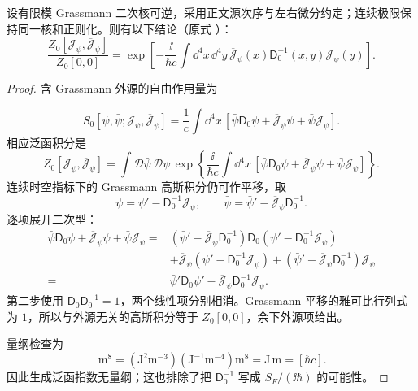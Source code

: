 \begin{proposition}
设有限模 Grassmann 二次核可逆，采用正文源次序与左右微分约定；连续极限保持同一核和正则化。则有以下结论（原式 ）：
\begin{equation*}
 \boxed{
 \frac{Z_0[\mathcal J_\psi,\overline{\mathcal J}_\psi]}{Z_0[0,0]}
 =\exp\!\left[
 -\frac{\ii}{\hbar c}
 \int\dd^4 x\,\dd^4 y\,
 \overline{\mathcal J}_\psi(x)\mathsf D_0^{-1}(x,y)\mathcal J_\psi(y)
 \right].}
\end{equation*}
\end{proposition}
\begin{proof}
含 Grassmann 外源的自由作用量为

\begin{equation*}
 S_0[\psi,\bar\psi;\mathcal J_\psi,\overline{\mathcal J}_\psi]
 =\frac1c\int\dd^4 x\,
 \left[
 \bar\psi\mathsf D_0\psi+\overline{\mathcal J}_\psi\psi+\bar\psi\mathcal J_\psi
 \right].
\end{equation*}
相应泛函积分是
\begin{equation*}
 Z_0[\mathcal J_\psi,\overline{\mathcal J}_\psi]
 =\int\mathcal D\bar\psi\,\mathcal D\psi\,
 \exp\!\left\{\frac{\ii}{\hbar c}
 \int\dd^4 x\,
 [\bar\psi\mathsf D_0\psi+\overline{\mathcal J}_\psi\psi+\bar\psi\mathcal J_\psi]\right\}.
\end{equation*}
连续时空指标下的 Grassmann 高斯积分仍可作平移，取
\begin{equation*}
 \psi=\psi'-\mathsf D_0^{-1}\mathcal J_\psi,
 \qquad
 \bar\psi=\bar\psi'-\overline{\mathcal J}_\psi\mathsf D_0^{-1}.
\end{equation*}
逐项展开二次型：
\begin{align*}
 \bar\psi\mathsf D_0\psi
 +\overline{\mathcal J}_\psi\psi+\bar\psi\mathcal J_\psi
 ={}&
 (\bar\psi'-\overline{\mathcal J}_\psi\mathsf D_0^{-1})
 \mathsf D_0(\psi'-\mathsf D_0^{-1}\mathcal J_\psi)\\
 &+\overline{\mathcal J}_\psi(\psi'-\mathsf D_0^{-1}\mathcal J_\psi)
 +(\bar\psi'-\overline{\mathcal J}_\psi\mathsf D_0^{-1})\mathcal J_\psi\\
 ={}&\bar\psi'\mathsf D_0\psi'
 -\overline{\mathcal J}_\psi\mathsf D_0^{-1}\mathcal J_\psi.
\end{align*}
第二步使用 $\mathsf D_0\mathsf D_0^{-1}=1$，两个线性项分别相消。Grassmann 平移的雅可比行列式为 $1$，所以与外源无关的高斯积分等于 $Z_0[0,0]$，余下外源项给出。

量纲检查为
\begin{equation*}
 [\mathcal J_\psi][\overline{\mathcal J}_\psi][\mathsf D_0^{-1}]\,\mathrm{m^8}
 =(\mathrm{J^2m^{-3}})(\mathrm{J^{-1}m^{-4}})\mathrm{m^8}
 =\mathrm{J\,m}
 =[\hbar c].
\end{equation*}
因此生成泛函指数无量纲；这也排除了把 $\mathsf D_0^{-1}$ 写成 $S_F/(\ii\hbar)$ 的可能性。
\end{proof}

